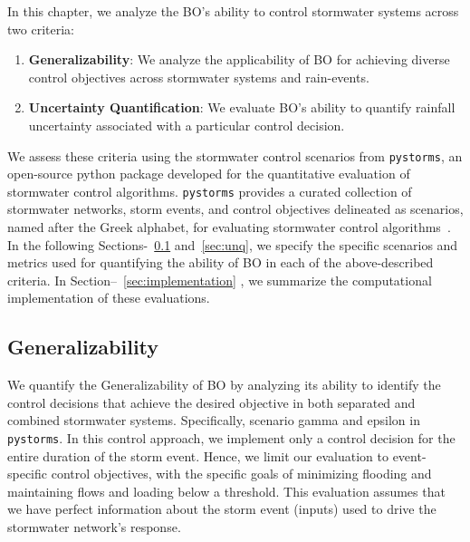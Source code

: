 In this chapter, we analyze the BO's ability to control stormwater systems across two criteria:%
\begin{enumerate}
	\item \textbf{Generalizability}: We analyze the applicability of BO for achieving diverse control objectives across stormwater systems and rain-events.
	\item \textbf{Uncertainty Quantification}: We evaluate BO's ability to quantify rainfall uncertainty associated with a particular control decision.
\end{enumerate}
We assess these criteria using the stormwater control scenarios from \texttt{pystorms}, an open-source python package developed for the quantitative evaluation of stormwater control algorithms.
\texttt{pystorms} provides a curated collection of stormwater networks, storm events, and control objectives delineated as scenarios, named after the Greek alphabet, for evaluating stormwater control algorithms~\cite{Rimer2019}.
In the following Sections-~\ref{sec:general} and~\ref{sec:unq}, we specify the specific scenarios and metrics used for quantifying the ability of BO in each of the above-described criteria.
In Section--~\ref{sec:implementation} , we summarize the computational implementation of these evaluations.

\subsection{Generalizability}\label{sec:general}
We quantify the Generalizability of BO by analyzing its ability to identify the control decisions that achieve the desired objective in both separated and combined stormwater systems.
Specifically, scenario gamma and epsilon in \texttt{pystorms}.
In this control approach, we implement only a control decision for the entire duration of the storm event. Hence, we limit our evaluation to event-specific control objectives, with the specific goals of minimizing flooding and maintaining flows and loading below a threshold.
This evaluation assumes that we have perfect information about the storm event (inputs) used to drive the stormwater network's response.

